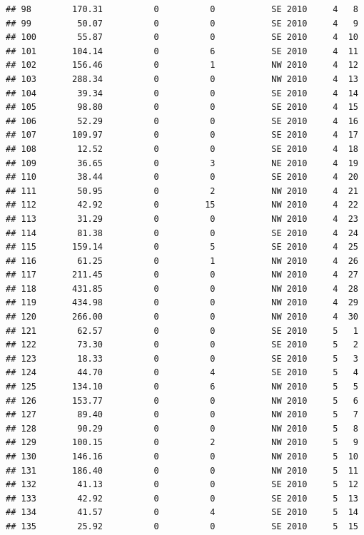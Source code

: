\documentclass[
]{article}
\begin{document}
\begin{verbatim}
## 98        170.31          0          0           SE 2010     4   8
## 99         50.07          0          0           SE 2010     4   9
## 100        55.87          0          0           SE 2010     4  10
## 101       104.14          0          6           SE 2010     4  11
## 102       156.46          0          1           NW 2010     4  12
## 103       288.34          0          0           NW 2010     4  13
## 104        39.34          0          0           SE 2010     4  14
## 105        98.80          0          0           SE 2010     4  15
## 106        52.29          0          0           SE 2010     4  16
## 107       109.97          0          0           SE 2010     4  17
## 108        12.52          0          0           SE 2010     4  18
## 109        36.65          0          3           NE 2010     4  19
## 110        38.44          0          0           SE 2010     4  20
## 111        50.95          0          2           NW 2010     4  21
## 112        42.92          0         15           NW 2010     4  22
## 113        31.29          0          0           NW 2010     4  23
## 114        81.38          0          0           SE 2010     4  24
## 115       159.14          0          5           SE 2010     4  25
## 116        61.25          0          1           NW 2010     4  26
## 117       211.45          0          0           NW 2010     4  27
## 118       431.85          0          0           NW 2010     4  28
## 119       434.98          0          0           NW 2010     4  29
## 120       266.00          0          0           NW 2010     4  30
## 121        62.57          0          0           SE 2010     5   1
## 122        73.30          0          0           SE 2010     5   2
## 123        18.33          0          0           SE 2010     5   3
## 124        44.70          0          4           SE 2010     5   4
## 125       134.10          0          6           NW 2010     5   5
## 126       153.77          0          0           NW 2010     5   6
## 127        89.40          0          0           NW 2010     5   7
## 128        90.29          0          0           NW 2010     5   8
## 129       100.15          0          2           NW 2010     5   9
## 130       146.16          0          0           NW 2010     5  10
## 131       186.40          0          0           NW 2010     5  11
## 132        41.13          0          0           SE 2010     5  12
## 133        42.92          0          0           SE 2010     5  13
## 134        41.57          0          4           SE 2010     5  14
## 135        25.92          0          0           SE 2010     5  15

\end{verbatim}
\end{document}

